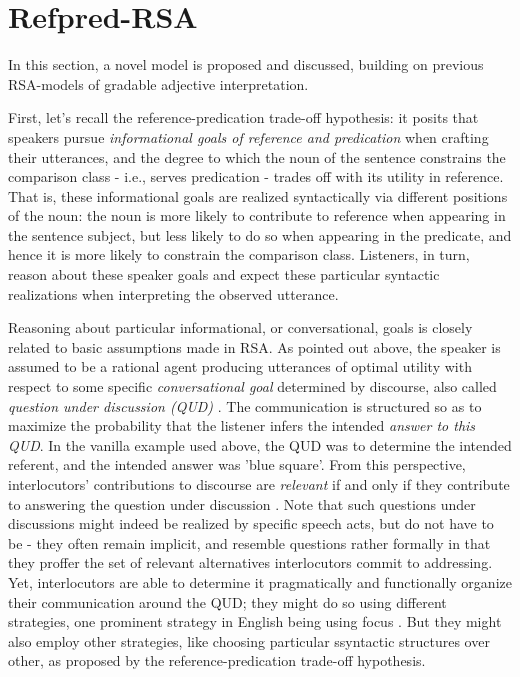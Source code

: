 \section{Refpred-RSA}
In this section, a novel model is proposed and discussed, building on previous RSA-models of gradable adjective interpretation.

First, let's recall the reference-predication trade-off hypothesis: it posits that speakers pursue \emph{informational goals of reference and predication} when crafting their utterances, and the degree to which the noun of the sentence constrains the comparison class - i.e., serves predication - trades off with its utility in reference. That is, these informational goals are realized syntactically via different positions of the noun: the noun is more likely to contribute to reference when appearing in the sentence subject, but less likely to do so when appearing in the predicate, and hence it is more likely to constrain the comparison class. Listeners, in turn, reason about these speaker goals and expect these particular syntactic realizations when interpreting the observed utterance.  

Reasoning about particular informational, or conversational, goals is closely related to basic assumptions made in RSA.
As pointed out above, the speaker is assumed to be a rational agent producing utterances of optimal utility with respect to some specific \emph{conversational goal} determined by discourse, also called \emph{question under discussion (QUD)}  \parencite{lassiter2017adjectival, roberts2012information}. The communication is structured so as to maximize the probability that the listener infers the intended \emph{answer to this QUD}. In the vanilla example used above, the QUD was to determine the intended referent, and the intended answer was 'blue square'. From this perspective, interlocutors' contributions to discourse are \emph{relevant} if and only if they contribute to answering the question under discussion \parencite{roberts2012information}. Note that such questions under discussions might indeed be realized by specific speech acts, but do not have to be - they often remain implicit, and resemble questions rather formally in that they proffer the set of relevant alternatives interlocutors commit to addressing. Yet, interlocutors are able to determine it pragmatically and functionally organize their communication around the QUD; they might do so using different strategies, one prominent strategy in English being using focus \parencite{roberts2012information}. But they might also employ other strategies, like choosing particular ssyntactic structures over other, as proposed by the reference-predication trade-off hypothesis.  

